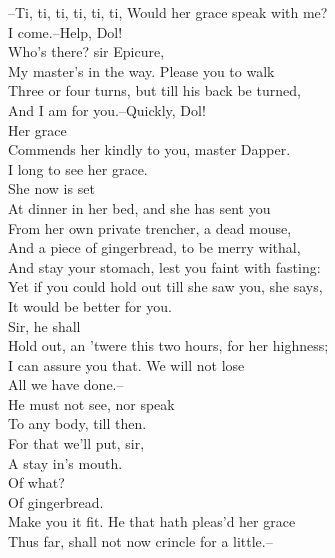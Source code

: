 \documentclass{memoir}
\begin{document}
\begin{drama*}
 --Ti, ti, ti, ti, ti, ti, Would her grace speak with me?\\
 I come.--Help, Dol!\\
\facespeaks {} Who's there? sir Epicure,\\
 My master's in the way. Please you to walk\\
 Three or four turns, but till his back be turned,\\
 And I am for you.--Quickly, Dol!\\
\subtlespeaks {} Her grace\\
 Commends her kindly to you, master Dapper.\\
\dapperspeaks  I long to see her grace.\\
\subtlespeaks {} She now is set\\
 At dinner in her bed, and she has sent you\\
 From her own private trencher, a dead mouse,\\
 And a piece of gingerbread, to be merry withal,\\
 And stay your stomach, lest you faint with fasting:\\
 Yet if you could hold out till she saw you, she says,\\
 It would be better for you.\\
\facespeaks {} Sir, he shall\\
 Hold out, an 'twere this two hours, for her highness;\\
 I can assure you that. We will not lose\\
 All we have done.--\\
\subtlespeaks {} He must not see, nor speak\\
 To any body, till then.\\
\facespeaks {} For that we'll put, sir,\\
 A stay in's mouth.\\
\subtlespeaks {} Of what?\\
\facespeaks {} Of gingerbread.\\
 Make you it fit. He that hath pleas'd her grace\\
 Thus far, shall not now crincle for a little.--\\

\end{drama*}
\end{document}
